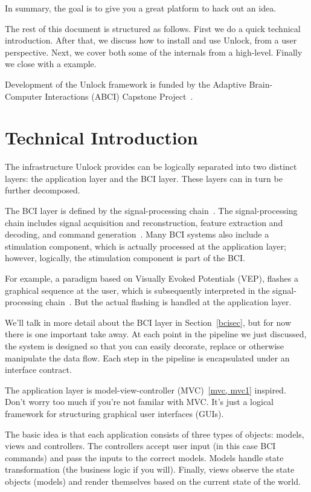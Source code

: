 \documentclass[11pt]{article}
\begin{document}
In summary, the goal is to give you a great platform to hack out an idea.

The rest of this document is structured as follows.  %
First we do a quick technical introduction.  After that, we discuss how to install and use Unlock, from a user perspective.  Next, we cover both some of the internals from a high-level.  Finally we close with a example.

Development of the Unlock framework is funded by the Adaptive Brain-Computer Interactions (ABCI) Capstone Project~\cite{abci}.

\section{Technical Introduction}

The infrastructure Unlock provides can be logically separated into two distinct layers: the application layer and the BCI layer.  These layers can in turn be further decomposed.

The BCI layer is defined by the signal-processing chain~\cite{signalprocessing}.  The signal-processing chain includes signal acquisition and reconstruction, feature extraction and decoding, and command generation~\cite{neuraleng}.  Many BCI systems also include a stimulation component, which is actually processed at the application layer; however, logically, the stimulation component is part of the BCI.

For example, a paradigm based on Visually Evoked Potentials (VEP), flashes a graphical sequence at the user, which is subsequently interpreted in the signal-processing chain~\cite{vep}.  But the actual flashing is handled at the application layer.

We'll talk in more detail about the BCI layer in Section~\ref{bcisec}, but for now there is one important take away.  At each point in the pipeline we just discussed, the system is designed so that you can easily decorate, replace or otherwise manipulate the data flow.  Each step in the pipeline is encapsulated under an interface contract.

The application layer is model-view-controller (MVC)~\ref{mvc, mvc1} inspired.  Don't worry too much if you're not familar with MVC.  It's just a logical framework for structuring graphical user interfaces (GUIs).  

The basic idea is that each application consists of three types of objects: models, views and controllers.  The controllers accept user input (in this case BCI commands) and pass the inputs to the correct models.  Models handle state transformation (the business logic if you will).  Finally, views observe the state objects (models) and render themselves based on the current state of the world.
\end{document}
